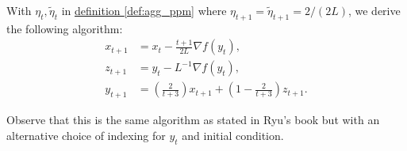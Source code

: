 \documentclass[12pt]{article}
\begin{document}
        \begin{proposition}
            With $\eta_t, \tilde \eta_t$ in \hyperref[def:agg_ppm]{definition \ref*{def:agg_ppm}} where $\eta_{t + 1} = \tilde \eta_{t + 1} = 2/(2L)$, we derive the following algorithm: 
            \begin{align*}
                x_{t + 1} &= x_t - \frac{t + 1}{2L} \nabla f(y_t), 
                \\
                z_{t + 1} &= y_t - L^{-1} \nabla f(y_t), 
                \\
                y_{t + 1} &= 
                \left(
                    \frac{2}{t + 3}
                \right)x_{t +1} + 
                \left(
                    1 - \frac{2}{t + 3}
                \right)z_{t + 1}. 
            \end{align*}
        \end{proposition}
        \begin{observation}
            Observe that this is the same algorithm as stated in Ryu's book but with an alternative choice of indexing for $y_t$ and initial condition. 
        \end{observation}
\end{document}

